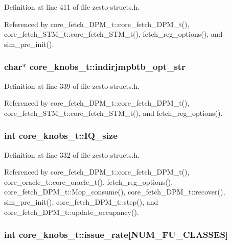Definition at line 411 of file zesto-structs.h.

Referenced by core\_\-fetch\_\-DPM\_\-t::core\_\-fetch\_\-DPM\_\-t(), core\_\-fetch\_\-STM\_\-t::core\_\-fetch\_\-STM\_\-t(), fetch\_\-reg\_\-options(), and sim\_\-pre\_\-init().
\subsubsection[{indirjmpbtb\_\-opt\_\-str}]{\setlength{\rightskip}{0pt plus 5cm}char$\ast$ {\bf core\_\-knobs\_\-t::indirjmpbtb\_\-opt\_\-str}}\label{structcore__knobs__t_3b1187547c8746eed095a4cd2e740952}




Definition at line 339 of file zesto-structs.h.

Referenced by core\_\-fetch\_\-DPM\_\-t::core\_\-fetch\_\-DPM\_\-t(), core\_\-fetch\_\-STM\_\-t::core\_\-fetch\_\-STM\_\-t(), and fetch\_\-reg\_\-options().
\subsubsection[{IQ\_\-size}]{\setlength{\rightskip}{0pt plus 5cm}int {\bf core\_\-knobs\_\-t::IQ\_\-size}}\label{structcore__knobs__t_2e52f47618b01dd4f95b250f0a6d0337}




Definition at line 332 of file zesto-structs.h.

Referenced by core\_\-fetch\_\-DPM\_\-t::core\_\-fetch\_\-DPM\_\-t(), core\_\-oracle\_\-t::core\_\-oracle\_\-t(), fetch\_\-reg\_\-options(), core\_\-fetch\_\-DPM\_\-t::Mop\_\-consume(), core\_\-fetch\_\-DPM\_\-t::recover(), sim\_\-pre\_\-init(), core\_\-fetch\_\-DPM\_\-t::step(), and core\_\-fetch\_\-DPM\_\-t::update\_\-occupancy().
\subsubsection[{issue\_\-rate}]{\setlength{\rightskip}{0pt plus 5cm}int {\bf core\_\-knobs\_\-t::issue\_\-rate}[NUM\_\-FU\_\-CLASSES]}\label{structcore__knobs__t_b5e29b731f4e53f680cdf44e785e8b45}




